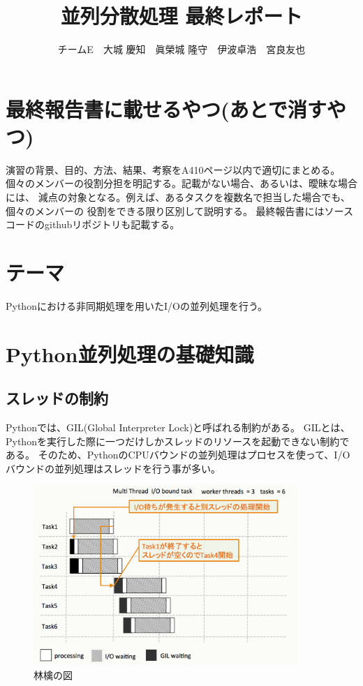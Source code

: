 \documentclass[14pt, oneside]{article}     	%
\title{並列分散処理  最終レポート}
\author{チームE　大城 慶知　眞榮城 隆守　伊波卓浩　宮良友也}
\begin{document}
\maketitle

\section*{最終報告書に載せるやつ(あとで消すやつ)}

演習の背景、目的、方法、結果、考察をA410ページ以内で適切にまとめる。
個々のメンバーの役割分担を明記する。記載がない場合、あるいは、曖昧な場合には、
減点の対象となる。例えば、あるタスクを複数名で担当した場合でも、個々のメンバーの
役割をできる限り区別して説明する。
最終報告書にはソースコードのgithubリポジトリも記載する。

\section{テーマ}
Pythonにおける非同期処理を用いたI/Oの並列処理を行う。

\section{Python並列処理の基礎知識}

\subsection{スレッドの制約}
Pythonでは、GIL(Global Interpreter Lock)と呼ばれる制約がある。
GILとは、Pythonを実行した際に一つだけしかスレッドのリソースを起動できない制約である。
そのため、PythonのCPUバウンドの並列処理はプロセスを使って、I/Oバウンドの並列処理はスレッドを行う事が多い。

\begin{figure}[h]
  \centering
  \includegraphics[width=10cm]{multithred_iobound.png}
  \caption{林檎の図}
\end{figure}
\end{document}
